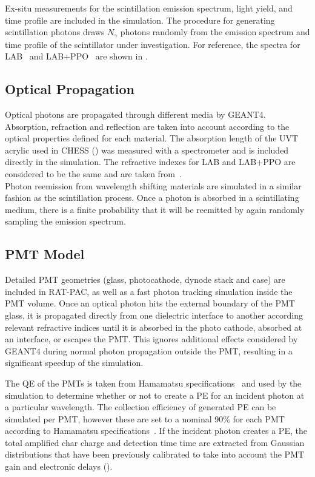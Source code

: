 Ex-situ measurements for the scintillation emission spectrum, light yield, and time profile are included in the simulation. 
The procedure for generating scintillation photons draws $N_{\gamma}$ photons randomly from the emission spectrum and time profile of the scintillator under investigation. 
For reference, the spectra for LAB~\cite{lab_emission} and LAB+PPO~\cite{snop_private} are shown in . 


\subsection{Optical Propagation \label{sec:optics}}

Optical photons are propagated through different media by GEANT4. 
Absorption, refraction and reflection are taken into account according to the optical properties defined for each material. 
The absorption length of the UVT acrylic used in CHESS () was measured with a spectrometer and is included directly in the simulation.  
The refractive indexes for LAB and LAB+PPO are considered to be the same and are taken from~\cite{snop_private}. \\
Photon reemission from wavelength shifting materials are simulated in a similar fashion as the scintillation process. Once a photon is absorbed in a scintillating medium, there is a finite probability that it will be reemitted by again randomly sampling the emission spectrum.

\subsection{PMT Model \label{sec:pmt_model}}

Detailed PMT geometries (glass, photocathode, dynode stack and case) are included in RAT-PAC, as well as a fast photon tracking simulation inside the PMT volume. 
Once an optical photon hits the external boundary of the PMT glass, it is propagated directly from one dielectric interface to another according relevant refractive indices until it is absorbed in the photo cathode, absorbed at an interface, or escapes the PMT.
This ignores additional effects considered by GEANT4 during normal photon propagation outside the PMT, resulting in a significant speedup of the simulation.

The QE of the PMTs is taken from Hamamatsu specifications~\cite{h11934} and used by the simulation to determine whether or not to create a PE for an incident photon at a particular wavelength. 
The collection efficiency of generated PE can be simulated per PMT, however these are set to a nominal 90\% for each PMT according to Hamamatsu specifications~\cite{hamamatsu}.  
If the incident photon creates a PE, the total amplified char charge and detection time time are extracted from Gaussian distributions that have been previously calibrated to take into account the PMT gain and electronic delays ().

